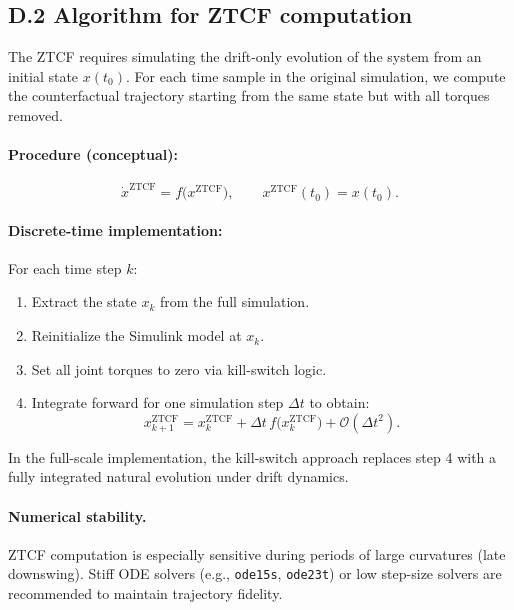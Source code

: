 \documentclass[12pt]{article}
\begin{document}
\subsection{D.2 \quad Algorithm for ZTCF computation}

The ZTCF requires simulating the drift-only evolution of the system from an initial state \(x(t_0)\). For each time sample in the original simulation, we compute the counterfactual trajectory starting from the same state but with all torques removed.

\paragraph{Procedure (conceptual):}
\[
  \dot{x}^{\mathrm{ZTCF}} = f\big(x^{\mathrm{ZTCF}}\big), 
  \qquad
  x^{\mathrm{ZTCF}}(t_0) = x(t_0).
\]

\paragraph{Discrete-time implementation:}
For each time step \(k\):
\begin{enumerate}
  \item Extract the state \(x_k\) from the full simulation.
  \item Reinitialize the Simulink model at \(x_k\).
  \item Set all joint torques to zero via kill-switch logic.
  \item Integrate forward for one simulation step \(\Delta t\) to obtain:
    \[
      x^{\mathrm{ZTCF}}_{k+1}
      = x^{\mathrm{ZTCF}}_k 
      + \Delta t\, f\big(x^{\mathrm{ZTCF}}_k\big)
      + \mathcal{O}(\Delta t^2).
    \]
\end{enumerate}

In the full-scale implementation, the kill-switch approach replaces step 4 with a fully integrated natural evolution under drift dynamics.

\paragraph{Numerical stability.}
ZTCF computation is especially sensitive during periods of large curvatures (late downswing). Stiff ODE solvers (e.g., \texttt{ode15s}, \texttt{ode23t}) or low step-size solvers are recommended to maintain trajectory fidelity.
\end{document}
